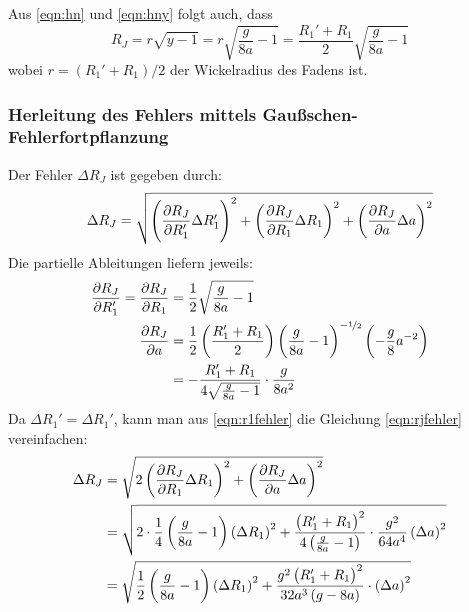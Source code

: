         Aus \eqref{eqn:hn} und \eqref{eqn:hny} folgt auch, dass
        \begin{equation}
            R_{J} = r\sqrt{y-1} = r\sqrt{\frac{g}{8a}-1} = \frac{R_1' + R_1}{2}\sqrt{\frac{g}{8a}-1} \label{eqn:rjorig}
        \end{equation}
        wobei $r = \left(R_1' + R_1\right)/2$ der Wickelradius des Fadens ist.

        \subsubsection{Herleitung des Fehlers mittels Gaußschen-Fehlerfortpflanzung}
            Der Fehler $\Delta R_J$ ist gegeben durch:
            \begin{equation}
                \Delta R_J = \sqrt{\left(\pdv{R_J}{R_1'} \Delta R_1'\right)^2 + \left(\pdv{R_J}{R_1} \Delta R_1\right)^2 + \left(\pdv{R_J}{a} \Delta a\right)^2} \label{eqn:rjfehler}
            \end{equation}
            Die partielle Ableitungen liefern jeweils:
            \begin{align}
                \pdv{R_J}{R_1'} = \pdv{R_J}{R_1} &= \frac{1}{2}\sqrt{\frac{g}{8a} -1} \label{eqn:r1fehler} \\
                \pdv{R_J}{a} &= \frac{1}{2}\left(\frac{R_1' + R_1}{2}\right)\left(\frac{g}{8a} -1\right)^{-\nicefrac{1}{2}}\left(-\frac{g}{8}a^{-2}\right) \notag \\
                &= -\frac{R_1' + R_1}{4\sqrt{\frac{g}{8a} -1}}\cdot \frac{g}{8a^2}
            \end{align}
            Da $\Delta R_1' = \Delta R_1'$, kann man aus \eqref{eqn:r1fehler} die Gleichung \eqref{eqn:rjfehler} vereinfachen:
            \begin{align}
                \Delta R_J &= \sqrt{2\left(\pdv{R_J}{R_1} \Delta R_1\right)^2 + \left(\pdv{R_J}{a} \Delta a\right)^2} \notag \\
                &= \sqrt{2\cdot\frac{1}{4}\left(\frac{g}{8a} -1\right)\left(\Delta R_1\right)^2 + \frac{\left(R_1' + R_1\right)^2}{4\left(\frac{g}{8a} -1\right)}\cdot \frac{g^2}{64a^4}\left(\Delta a\right)^2} \notag \\
                &= \sqrt{\frac{1}{2}\left(\frac{g}{8a} -1\right)\left(\Delta R_1\right)^2 + \frac{g^2\left(R_1' + R_1\right)^2}{32a^3\left(g-8a\right)}\cdot\left(\Delta a\right)^2} \label{eqn:deltarj}
            \end{align}
            
